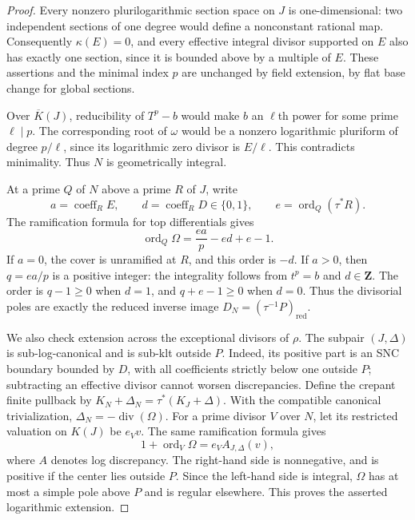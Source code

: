 \begin{proof}
Every nonzero plurilogarithmic section space on $J$ is
one-dimensional: two independent sections of one degree would
define a nonconstant rational map. Consequently $\kappa(E)=0$,
and every effective integral divisor supported on $E$ also has
exactly one section, since it is bounded above by a multiple of $E$.
These assertions and the minimal index $p$ are unchanged by field
extension, by flat base change for global sections.

Over $\overline K(J)$, reducibility of $T^p-b$ would make $b$
an $\ell$th power for some prime $\ell\mid p$. The corresponding
root of $\omega$ would be a nonzero logarithmic pluriform of
degree $p/\ell$, since its logarithmic zero divisor is $E/\ell$.
This contradicts minimality. Thus $N$ is geometrically integral.

At a prime $Q$ of $N$ above a prime $R$ of $J$, write
\[
 a=\operatorname{coeff}_R E,\qquad
 d=\operatorname{coeff}_R D\in\{0,1\},\qquad
 e=\operatorname{ord}_Q(\tau^*R).
\]
The ramification formula for top differentials gives
\begin{equation}\label{eq:cyclic-root-order}
 \operatorname{ord}_Q\Omega=\frac{ea}{p}-ed+e-1.
\end{equation}
If $a=0$, the cover is unramified at $R$, and this order is
$-d$. If $a>0$, then $q=ea/p$ is a positive integer: the
integrality follows from $t^p=b$ and $d\in\mathbf Z$.
The order is $q-1\ge0$ when $d=1$, and $q+e-1\ge0$ when
$d=0$. Thus the divisorial poles are exactly the reduced inverse
image $D_N=(\tau^{-1}P)_{\mathrm{red}}$.

We also check extension across the exceptional divisors of $\rho$.
The subpair $(J,\Delta)$ is sub-log-canonical and is sub-klt
outside $P$. Indeed, its positive part is an SNC boundary bounded
by $D$, with all coefficients strictly below one outside $P$;
subtracting an effective divisor cannot worsen discrepancies.
Define the crepant finite pullback by
$K_N+\Delta_N=\tau^*(K_J+\Delta)$. With the compatible
canonical trivialization, $\Delta_N=-\operatorname{div}(\Omega)$.
For a prime divisor $V$ over $N$, let its restricted valuation
on $K(J)$ be $e_Vv$. The same ramification formula gives
\[
 1+\operatorname{ord}_V\Omega
       =e_V A_{J,\Delta}(v),
\]
where $A$ denotes log discrepancy. The right-hand side is
nonnegative, and is positive if the center lies outside $P$.
Since the left-hand side is integral, $\Omega$ has at most a
simple pole above $P$ and is regular elsewhere. This proves the
asserted logarithmic extension.


\end{proof}
